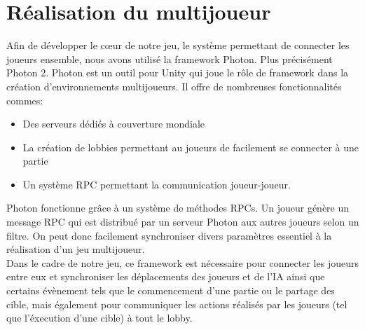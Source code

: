 \documentclass[../doc.tex]{subfiles}
\begin{document}
    \section{Réalisation du multijoueur}
Afin de développer le cœur de notre jeu, le système permettant de connecter les joueurs ensemble, nous avons utilisé la framework Photon. Plus précisément Photon 2. \newline
Photon est un outil pour Unity qui joue le rôle de framework dans la création d'environnements multijoueurs. Il offre de nombreuses fonctionnalités commes:
\begin{itemize}
    \item Des serveurs dédiés à couverture mondiale
    \item La création de lobbies permettant au joueurs de facilement se connecter à une partie
    \item Un système RPC permettant la communication joueur-joueur.\\
    
\end{itemize}
Photon fonctionne grâce à un système de méthodes RPCs. Un joueur génère un message RPC qui est distribué par un serveur Photon aux autres joueurs selon un filtre. On peut donc facilement synchroniser divers paramètres essentiel à la réalisation d'un jeu multijoueur.\\

Dans le cadre de notre jeu, ce framework est nécessaire pour connecter les joueurs entre eux et synchroniser les déplacements des joueurs et de l'IA ainsi que certains évènement tels que le commencement d'une partie ou le partage des cible, mais également pour communiquer les actions réalisés par les joueurs (tel que l'éxecution d'une cible) à tout le lobby.
\end{document}
